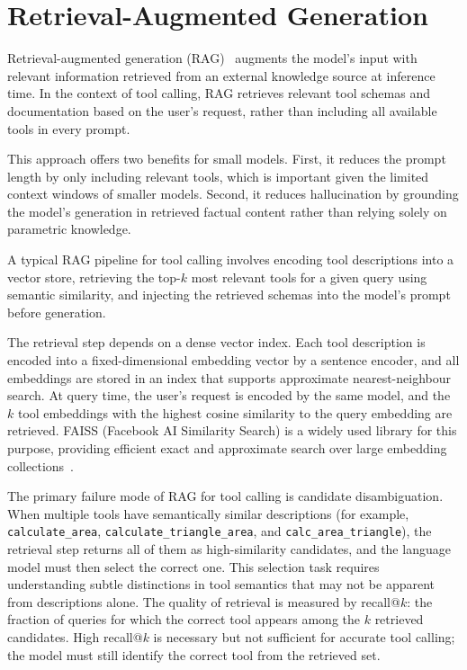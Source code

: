 \section{Retrieval-Augmented Generation}

Retrieval-augmented generation (RAG)~\cite{lewis2020retrieval} augments the model's input with relevant information retrieved from an external knowledge source at inference time. In the context of tool calling, RAG retrieves relevant tool schemas and documentation based on the user's request, rather than including all available tools in every prompt.

This approach offers two benefits for small models. First, it reduces the prompt length by only including relevant tools, which is important given the limited context windows of smaller models. Second, it reduces hallucination by grounding the model's generation in retrieved factual content rather than relying solely on parametric knowledge.

A typical RAG pipeline for tool calling involves encoding tool
descriptions into a vector store, retrieving the top-$k$ most relevant
tools for a given query using semantic similarity, and injecting the
retrieved schemas into the model's prompt before generation.

The retrieval step depends on a dense vector index. Each tool
description is encoded into a fixed-dimensional embedding vector by a
sentence encoder, and all embeddings are stored in an index that
supports approximate nearest-neighbour search. At query time, the
user's request is encoded by the same model, and the $k$ tool
embeddings with the highest cosine similarity to the query embedding
are retrieved. FAISS (Facebook AI Similarity Search) is a widely used
library for this purpose, providing efficient exact and approximate
search over large embedding collections~\cite{johnson2019billion}.

The primary failure mode of RAG for tool calling is candidate
disambiguation. When multiple tools have semantically similar
descriptions (for example, \texttt{calculate\_area},
\texttt{calculate\_\allowbreak{}triangle\_\allowbreak{}area}, and
\texttt{calc\_\allowbreak{}area\_\allowbreak{}triangle}), the retrieval step returns all of them
as high-similarity candidates, and the language model must then select
the correct one. This
selection task requires understanding subtle distinctions in tool
semantics that may not be apparent from descriptions alone. The
quality of retrieval is measured by recall@$k$: the fraction of
queries for which the correct tool appears among the $k$ retrieved
candidates. High recall@$k$ is necessary but not sufficient for
accurate tool calling; the model must still identify the correct tool
from the retrieved set.

